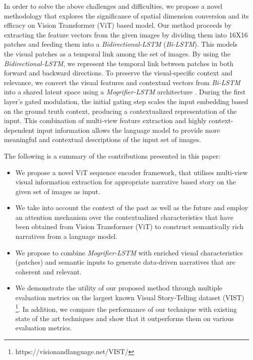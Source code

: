 \documentclass[runningheads]{llncs}
\begin{document}
In order to solve the above challenges and difficulties, we propose a novel methodology that explores the significance of spatial dimension conversion and its efficacy on Vision Transformer (ViT) \cite{dosovitskiy2020image} based model. Our method proceeds by extracting the feature vectors from the given images by dividing them into 16X16 patches and feeding them into a {\em Bidirectional-LSTM} ({\em Bi-LSTM}). This models the visual patches as a temporal link among the set of images. By using the {\em Bidirectional-LSTM}, we represent the temporal link between patches in both forward and backward directions. To preserve the visual-specific context and relevance, we convert the visual features and contextual vectors from {\em Bi-LSTM} into a shared latent space using a {\em Mogrifier-LSTM} architecture \cite{melis2019mogrifier}. During the first layer's gated modulation, the initial gating step scales the input embedding based on the ground truth context, producing a contextualized representation of the input. This combination of multi-view feature extraction and highly context-dependent input information allows the language model to provide more meaningful and contextual descriptions of the input set of images.

\noindent The following is a summary of the contributions presented in this paper:
\begin{itemize}
\item We propose a novel ViT sequence encoder framework, that utilises multi-view visual information extraction for appropriate narrative based story on the given set of images as input.

\item We take into account the context of the past as well as the future and employ an attention mechanism over the contextualized characteristics that have been obtained from Vision Transformer (ViT) to construct semantically rich narratives from a language model.

\item We propose to combine {\em Mogrifier-LSTM} with enriched visual characteristics (patches) and semantic inputs to generate data-driven narratives that are coherent and relevant.

\item We demonstrate the utility of our proposed method through multiple evaluation metrics on the largest known Visual Story-Telling dataset (VIST) \cite{huang2016visual}\footnote{https://visionandlanguage.net/VIST/}. In addition, we compare the performance of our technique with existing state of the art techniques and show that it outperforms them on various evaluation metrics.

\end{itemize}
\end{document}

